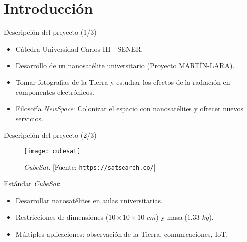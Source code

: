 \section{Introducción}


\begin{frame}{Descripción del proyecto (1/3)}

\begin{itemize}
\item Cátedra Universidad Carlos III - SENER.
\item Desarrollo de un nanosatélite universitario (Proyecto MARTÍN-LARA).
\item Tomar fotografías de la Tierra y estudiar los efectos de la radiación en componentes electrónicos.
\item Filosofía \emph{NewSpace}: Colonizar el espacio con nanosatélites y ofrecer nuevos servicios.
\end{itemize}

\end{frame}


\begin{frame}{Descripción del proyecto (2/3)}

\begin{figure}[h]
\centering
\texttt{[image: cubesat]}
\caption{\emph{CubeSat}. [Fuente: \texttt{https://satsearch.co/}]}
\end{figure}

Estándar \emph{CubeSat}:

\begin{itemize}
\item Desarrollar nanosatélites en aulas universitarias.
\item Restricciones de dimensiones ($10\times10\times10$ $cm$) y masa ($1.33$ $kg$).
\item Múltiples aplicaciones: observación de la Tierra, comunicaciones, IoT.
\end{itemize}

\end{frame}


